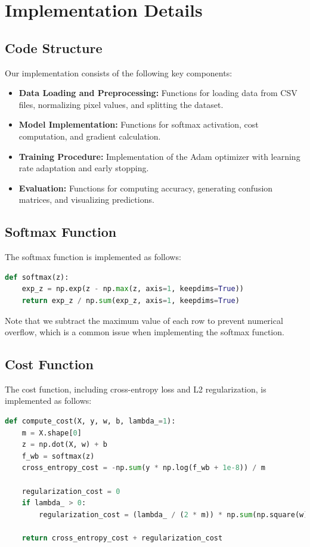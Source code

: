 \documentclass[10pt,journal,compsoc]{IEEEtran}
\begin{document}
\section{Implementation Details}
\subsection{Code Structure}
Our implementation consists of the following key components:

\begin{itemize}
    \item \textbf{Data Loading and Preprocessing:} Functions for loading data from CSV files, normalizing pixel values, and splitting the dataset.
    
    \item \textbf{Model Implementation:} Functions for softmax activation, cost computation, and gradient calculation.
    
    \item \textbf{Training Procedure:} Implementation of the Adam optimizer with learning rate adaptation and early stopping.
    
    \item \textbf{Evaluation:} Functions for computing accuracy, generating confusion matrices, and visualizing predictions.
\end{itemize}

\subsection{Softmax Function}
The softmax function is implemented as follows:

\begin{lstlisting}[language=Python]
def softmax(z):
    exp_z = np.exp(z - np.max(z, axis=1, keepdims=True))
    return exp_z / np.sum(exp_z, axis=1, keepdims=True)
\end{lstlisting}

Note that we subtract the maximum value of each row to prevent numerical overflow, which is a common issue when implementing the softmax function.

\subsection{Cost Function}
The cost function, including cross-entropy loss and L2 regularization, is implemented as follows:

\begin{lstlisting}[language=Python]
def compute_cost(X, y, w, b, lambda_=1):
    m = X.shape[0]
    z = np.dot(X, w) + b
    f_wb = softmax(z)
    cross_entropy_cost = -np.sum(y * np.log(f_wb + 1e-8)) / m
    
    regularization_cost = 0
    if lambda_ > 0:
        regularization_cost = (lambda_ / (2 * m)) * np.sum(np.square(w))
    
    return cross_entropy_cost + regularization_cost
\end{lstlisting}
\end{document}
